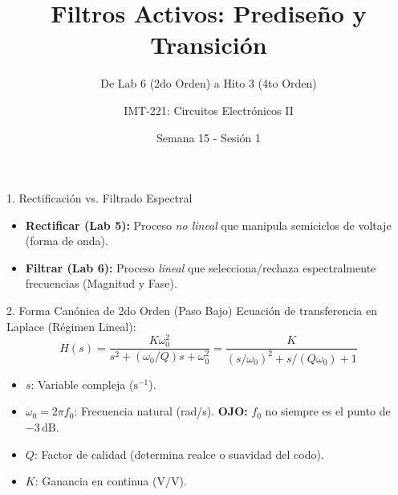 \documentclass[aspectratio=169, 10pt]{beamer}
\title{\textbf{Filtros Activos: Prediseño y Transición}}
\subtitle{De Lab 6 (2do Orden) a Hito 3 (4to Orden)}
\author{IMT-221: Circuitos Electrónicos II}
\institute{UCB Sede Tarija}
\date{Semana 15 - Sesión 1}
\begin{document}
\begin{frame}
    \titlepage
\end{frame}

\begin{frame}{1. Rectificación vs. Filtrado Espectral}
    \begin{itemize}
        \item \textbf{Rectificar (Lab 5):} Proceso \textit{no lineal} que manipula semiciclos de voltaje (forma de onda).
        \item \textbf{Filtrar (Lab 6):} Proceso \textit{lineal} que selecciona/rechaza espectralmente frecuencias (Magnitud y Fase).
    \end{itemize}
    \begin{center}
    \end{center}
\end{frame}

\begin{frame}{2. Forma Canónica de 2do Orden (Paso Bajo)}
    Ecuación de transferencia en Laplace (Régimen Lineal):
    \begin{equation}
        H(s) = \frac{K\omega_0^2}{s^2 + (\omega_0/Q)s + \omega_0^2} = \frac{K}{(s/\omega_0)^2 + s/(Q\omega_0) + 1}
    \end{equation}
    \begin{itemize}
        \item $s$: Variable compleja ($\mathrm{s}^{-1}$).
        \item $\omega_0 = 2\pi f_0$: Frecuencia natural (rad/s). \textbf{OJO:} $f_0$ no siempre es el punto de $-3\,\mathrm{dB}$.
        \item $Q$: Factor de calidad (determina realce o suavidad del codo).
        \item $K$: Ganancia en continua ($\mathrm{V/V}$).
    \end{itemize}
\end{frame}
\end{document}
